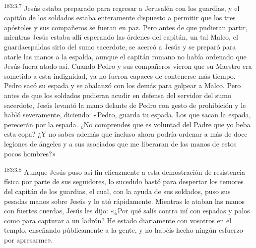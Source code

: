 \par 
\textsuperscript{183:3.7} Jesús estaba preparado para regresar a Jerusalén con los guardias, y el capitán de los soldados estaba enteramente dispuesto a permitir que los tres apóstoles y sus compañeros se fueran en paz. Pero antes de que pudieran partir, mientras Jesús estaba allí esperando las órdenes del capitán, un tal Malco, el guardaespaldas sirio del sumo sacerdote, se acercó a Jesús y se preparó para atarle las manos a la espalda, aunque el capitán romano no había ordenado que Jesús fuera atado así. Cuando Pedro y sus compañeros vieron que su Maestro era sometido a esta indignidad, ya no fueron capaces de contenerse más tiempo. Pedro sacó su espada y se abalanzó con los demás para golpear a Malco. Pero antes de que los soldados pudieran acudir en defensa del servidor del sumo sacerdote, Jesús levantó la mano delante de Pedro con gesto de prohibición y le habló severamente, diciendo: «Pedro, guarda tu espada. Los que sacan la espada, perecerán por la espada. ¿No comprendes que es voluntad del Padre que yo beba esta copa? ¿Y no sabes además que incluso ahora podría ordenar a más de doce legiones de ángeles y a sus asociados que me liberaran de las manos de estos pocos hombres?»

\par 
\textsuperscript{183:3.8} Aunque Jesús puso así fin eficazmente a esta demostración de resistencia física por parte de sus seguidores, lo sucedido bastó para despertar los temores del capitán de los guardias, el cual, con la ayuda de sus soldados, puso sus pesadas manos sobre Jesús y lo ató rápidamente. Mientras le ataban las manos con fuertes cuerdas, Jesús les dijo: «¿Por qué salís contra mí con espadas y palos como para capturar a un ladrón? He estado diariamente con vosotros en el templo, enseñando públicamente a la gente, y no habéis hecho ningún esfuerzo por apresarme».

